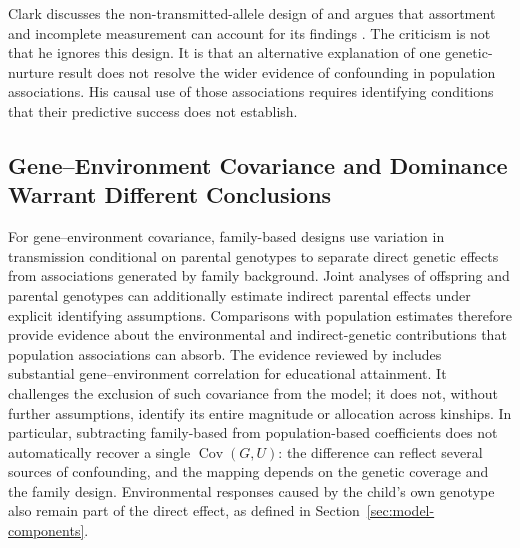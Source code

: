 Clark discusses the non-transmitted-allele design of \citet{KongEtAl2018}
and argues that assortment and incomplete measurement can account for its
findings \citep[pp.~83--84]{Clark2026}. The criticism is not that he ignores
this design. It is that an alternative explanation of one genetic-nurture
result does not resolve the wider evidence of confounding in population
associations. His causal use of those associations requires identifying
conditions that their predictive success does not establish.

\subsection{Gene--Environment Covariance and Dominance Warrant Different Conclusions}

For gene--environment covariance, family-based designs use variation in
transmission conditional on parental genotypes to separate direct genetic
effects from associations generated by family background. Joint analyses
of offspring and parental genotypes can additionally estimate indirect
parental effects under explicit identifying assumptions. Comparisons with
population estimates therefore provide evidence about the environmental
and indirect-genetic contributions that population associations can
absorb. The evidence reviewed by \citet[Sections~4.3--4.7]{BenjaminEtAl2026}
includes substantial gene--environment correlation for educational
attainment. It challenges the exclusion of such covariance from the model;
it does not, without further assumptions, identify its entire magnitude
or allocation across kinships. In particular, subtracting family-based
from population-based coefficients does not automatically recover a single
$\operatorname{Cov}(G,U)$: the difference can reflect several sources of
confounding, and the mapping depends on the genetic coverage and the
family design. Environmental responses caused by the child's own genotype
also remain part of the direct effect, as defined in Section~\ref{sec:model-components}.

